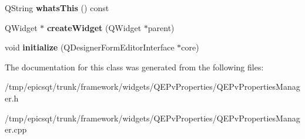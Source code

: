 \begin{DoxyCompactItemize}
\item 
\hypertarget{classQEPvPropertiesManager_ad380e8a0930fdc2b5eb7bbc907338749}{
QString {\bfseries whatsThis} () const }
\label{classQEPvPropertiesManager_ad380e8a0930fdc2b5eb7bbc907338749}

\item 
\hypertarget{classQEPvPropertiesManager_af9f7f2ba08e7f09d66383fb6a7af5d54}{
QWidget $\ast$ {\bfseries createWidget} (QWidget $\ast$parent)}
\label{classQEPvPropertiesManager_af9f7f2ba08e7f09d66383fb6a7af5d54}

\item 
\hypertarget{classQEPvPropertiesManager_afb8983e41dd31167022158d6f782843f}{
void {\bfseries initialize} (QDesignerFormEditorInterface $\ast$core)}
\label{classQEPvPropertiesManager_afb8983e41dd31167022158d6f782843f}

\end{DoxyCompactItemize}


The documentation for this class was generated from the following files:\begin{DoxyCompactItemize}
\item 
/tmp/epicsqt/trunk/framework/widgets/QEPvProperties/QEPvPropertiesManager.h\item 
/tmp/epicsqt/trunk/framework/widgets/QEPvProperties/QEPvPropertiesManager.cpp\end{DoxyCompactItemize}
